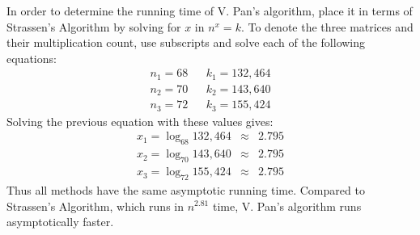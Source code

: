 In order to determine the running time of V. Pan's algorithm, place it in terms of Strassen's Algorithm by solving for $x$ in $n^x = k$. To denote the three matrices and their multiplication count, use subscripts and solve each of the following equations:
\begin{eqnarray*}
	n_1 = 68 & & k_1 = 132,464 \\
	n_2 = 70 & & k_2 = 143,640 \\
	n_3 = 72 & & k_3 = 155,424
\end{eqnarray*}
Solving the previous equation with these values gives:
\begin{eqnarray*}
	x_1 = \log_{68}{132,464} & \approx & 2.795 \\
	x_2 = \log_{70}{143,640} & \approx & 2.795 \\
	x_3 = \log_{72}{155,424} & \approx & 2.795
\end{eqnarray*}
Thus all methods have the same asymptotic running time. Compared to Strassen's Algorithm, which runs in $n^{2.81}$ time, V. Pan's algorithm runs asymptotically faster.
